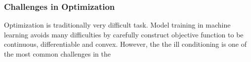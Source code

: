 \subsubsection{Challenges in Optimization}

Optimization is traditionally very difficult task. Model training in machine learning avoids many difficulties by carefully construct objective function to be continuous, differentiable and convex. However, the 
the ill conditioning is one of the most common challenges in the 